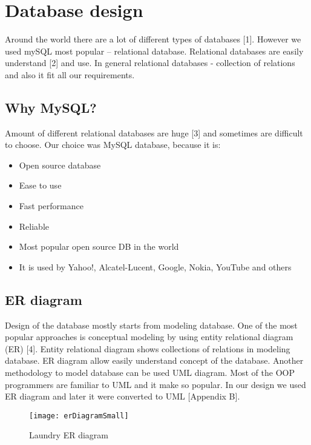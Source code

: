 %
\section{Database design}

Around the world there are a lot of different types of databases [1]. However we used mySQL most popular – relational database. Relational databases are easily understand [2] and use. In general relational databases - collection of relations and also it fit all our requirements.

\subsection{Why MySQL?}

Amount of different relational databases are huge [3] and sometimes are difficult to choose. Our choice was MySQL database, because it is:

\begin{itemize}
	\item Open source database
	\item Ease to use
	\item Fast performance
	\item Reliable 
	\item Most popular open source DB in the world
	\item It is used by Yahoo!, Alcatel-Lucent, Google, Nokia, YouTube and others
\end{itemize}

\subsection{ER diagram}

Design of the database mostly starts from modeling database. One of the most popular approaches is conceptual modeling by using entity relational diagram (ER) [4]. Entity relational diagram shows collections of relations in modeling database. ER diagram allow easily understand concept of the database. Another methodology to model database can be used UML diagram. Most of the OOP programmers are familiar to UML and it make so popular. In our design we used ER diagram and later it were converted to UML [Appendix B].

\begin{figure}[h]
	\centering
		\texttt{[image: erDiagramSmall]}
	\caption{Laundry ER diagram}
	\label{fig:planning}
\end{figure}

